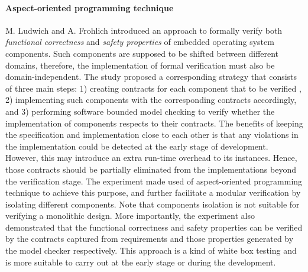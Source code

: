 

\paragraph{Aspect-oriented programming technique} M. Ludwich and A. Frohlich \cite{Ludwich:2013:FVC:2433140.2433148} introduced an approach to formally verify both \textit{functional correctness} and \textit{safety properties} of embedded operating system components. Such components are supposed to be shifted between different domains, therefore, the implementation of formal verification must also be domain-independent. The study proposed a corresponding strategy that consists of three main steps: 1) creating contracts for each component that to be verified , 2) implementing such components with the corresponding contracts accordingly, and 3) performing software bounded model checking to verify whether the implementation of components respects to their contracts. The benefits of keeping the specification and implementation close to each other is that any violations in the implementation could be detected at the early stage of development. However, this may introduce an extra run-time overhead to its instances. Hence, those contracts should be partially eliminated from the implementations beyond the verification stage. The experiment made used of aspect-oriented programming technique to achieve this purpose, and further facilitate a modular verification by isolating different components. Note that components isolation is not suitable for verifying a monolithic design. More importantly, the experiment also demonstrated that the functional correctness and safety properties can be verified by the contracts captured from requirements and those properties generated by the model checker respectively. This approach is a kind of white box testing and is more suitable to carry out at the early stage or during the development.

